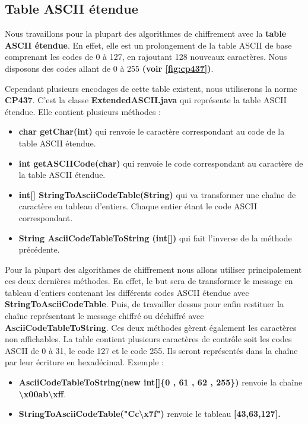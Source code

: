 \documentclass{article}
\begin{document}
\subsection{Table ASCII étendue}

Nous travaillons pour la plupart des algorithmes de chiffrement avec la \textbf{table ASCII étendue}. En effet, elle est un prolongement de la table ASCII de base comprenant les codes de 0 à 127, en rajoutant 128 nouveaux caractères. Nous disposons des codes allant de 0 à 255 \textbf{(voir \ref{fig:cp437})}.

Cependant plusieurs encodages de cette table existent, nous utiliserons la norme \textbf{CP437}.
C'est la classe \textbf{ExtendedASCII.java} qui représente la table ASCII étendue. Elle contient plusieurs méthodes :
\begin{itemize}
\item \textbf{char getChar(int)} qui renvoie le caractère correspondant au code de la table ASCII étendue.
\item \textbf{int getASCIICode(char)} qui renvoie le code correspondant au caractère de la table ASCII étendue.
\item \textbf{int[] StringToAsciiCodeTable(String)} qui va transformer une chaîne de caractère en tableau d'entiers. Chaque entier étant le code ASCII correspondant. 
\item \textbf{String \textbf{AsciiCodeTableToString} (int[])} qui fait l'inverse de la méthode précédente. 

\end{itemize}
\vspace{1\baselineskip}

Pour la plupart des algorithmes de chiffrement nous allons utiliser principalement ces deux dernières méthodes. En effet, le but sera de transformer le message en tableau d'entiers contenant les différents codes ASCII étendue avec \textbf{StringToAsciiCodeTable}. Puis, de travailler dessus pour enfin restituer la chaîne représentant le message chiffré ou déchiffré avec \textbf{AsciiCodeTableToString}.
Ces deux méthodes gèrent également les caractères non affichables. La table contient plusieurs caractères de contrôle soit les codes ASCII de 0 à 31, le code 127 et le code 255. Ils seront représentés dans la chaîne par leur écriture en hexadécimal.
Exemple :
\begin{itemize}
\item \textbf{AsciiCodeTableToString(new int[]\{0 , 61 , 62 , 255\})} renvoie la chaîne \textbf{\textbackslash x00ab\textbackslash xff}.
\item \textbf{StringToAsciiCodeTable("Cc\textbackslash x7f")} renvoie le tableau \textbf{[43,63,127].}

\end{itemize}
\end{document}
